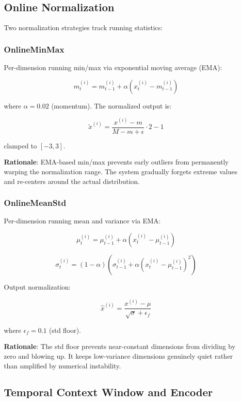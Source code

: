 \documentclass[12pt]{article}
\begin{document}
\subsection{Online Normalization}

Two normalization strategies track running statistics:

\subsubsection{OnlineMinMax}

Per-dimension running min/max via exponential moving average (EMA):

\[
  m_t^{(i)} = m_{t-1}^{(i)} + \alpha (x_t^{(i)} - m_{t-1}^{(i)})
\]

where $\alpha = 0.02$ (momentum). The normalized output is:

\[
  \tilde{x}^{(i)} = \frac{x^{(i)} - m}{M - m + \epsilon} \cdot 2 - 1
\]

clamped to $[-3, 3]$.

\textbf{Rationale}: EMA-based min/max prevents early outliers from
permanently warping the normalization range. The system gradually forgets
extreme values and re-centers around the actual distribution.

\subsubsection{OnlineMeanStd}

Per-dimension running mean and variance via EMA:

\[
  \mu_t^{(i)} = \mu_{t-1}^{(i)} + \alpha (x_t^{(i)} - \mu_{t-1}^{(i)})
\]

\[
  \sigma_t^{(i)} = (1 - \alpha) \left( \sigma_{t-1}^{(i)} +
    \alpha (x_t^{(i)} - \mu_{t-1}^{(i)})^2 \right)
\]

Output normalization:

\[
  \hat{x}^{(i)} = \frac{x^{(i)} - \mu}{\sqrt{\sigma} + \epsilon_f}
\]

where $\epsilon_f = 0.1$ (std floor).

\textbf{Rationale}: The std floor prevents near-constant dimensions from
dividing by zero and blowing up. It keeps low-variance dimensions genuinely
quiet rather than amplified by numerical instability.

\subsection{Temporal Context Window and Encoder}
\end{document}
